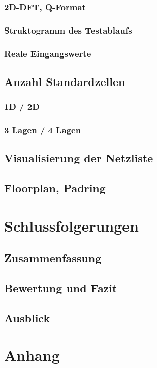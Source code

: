  \subsection{2D-DFT, Q-Format}
 \subsection{Struktogramm des Testablaufs}
 \subsection{Reale Eingangswerte}
 
 \section{Anzahl Standardzellen}
 \subsection{1D / 2D}
 \subsection{3 Lagen / 4 Lagen}
 \section{Visualisierung der Netzliste}
 \section{Floorplan, Padring}
 
 \chapter{Schlussfolgerungen}
 \section{Zusammenfassung}
 \section{Bewertung und Fazit}
 
 \section{Ausblick}
 
 
 \listoffigures

 \listoftables

 
 \printbibliography
 
 \chapter{Anhang}
 


